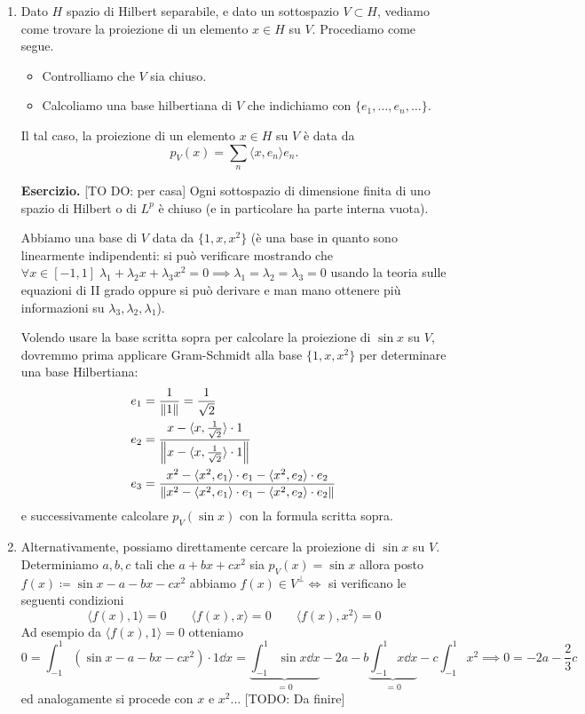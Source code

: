 \begin{enumerate}

\item Dato $H$ spazio di Hilbert separabile, e dato un sottospazio $V \subset H$, vediamo come trovare la proiezione di un elemento $x \in H$ su $V$. Procediamo come segue.
\begin{itemize}
	\item Controlliamo che $V$ sia chiuso.

	\item Calcoliamo una base hilbertiana di $V$ che indichiamo con $\{ e_1, \dots, e_n, \dots \}$. 
\end{itemize}
Il tal caso, la proiezione di un elemento $x \in H$  su $V$ è data da
$$
	p_V(x) = \sum_n \langle x, e_n \rangle e_n.
$$

\textbf{Esercizio.} [TO DO: per casa] Ogni sottospazio di dimensione finita  di uno spazio di Hilbert o di $L^p$ è chiuso (e in particolare ha parte interna vuota).

Abbiamo una base di $V$ data da $\{1, x, x^2\}$ (è una base in quanto sono linearmente indipendenti: si può verificare mostrando che $\forall x \in [-1, 1] \; \lambda_1 + \lambda_2 x + \lambda_3 x^2 = 0 \implies \lambda_1 = \lambda_2 = \lambda_3 = 0$ usando la teoria sulle equazioni di II grado oppure si può derivare e man mano ottenere più informazioni su $\lambda_3, \lambda_2, \lambda_1$).

Volendo usare la base scritta sopra per calcolare la proiezione di $\sin x$ su $V$, dovremmo prima applicare Gram-Schmidt alla base $\{1,x,x^2\}$ per determinare una base Hilbertiana:
$$
\begin{aligned}
	e_1 &= \frac{1}{\left\lVert 1 \right\rVert} = \frac{1}{\sqrt{2}} \\
	e_2 &= \frac{x - \langle x, \frac{1}{\sqrt 2} \rangle \cdot 1}{\left\lVert x - \langle x, \frac{1}{\sqrt 2} \rangle \cdot 1 \right\rVert} \\
	e_3 &= \frac{x^2 - \langle x^2, e_1 \rangle \cdot e_1 - \langle x^2, e_2 \rangle \cdot e_2}{\left\lVert x^2 - \langle x^2, e_1 \rangle \cdot e_1 - \langle x^2, e_2 \rangle \cdot e_2 \right\rVert} \\
\end{aligned}
$$
e successivamente calcolare $p_V(\sin x)$ con la formula scritta sopra.

\item Alternativamente, possiamo direttamente cercare la proiezione di $\sin x$ su $V$. Determiniamo $a, b, c$ tali che $a + b x + c x^2$ sia $p_V(x) = \sin x$ allora posto $f(x) \coloneqq \sin x - a - b x - c x^2$ abbiamo $f(x) \in V^\perp \iff $ si verificano le seguenti condizioni
$$
\langle f(x), 1 \rangle = 0
\qquad
\langle f(x), x \rangle = 0
\qquad
\langle f(x), x^2 \rangle = 0
$$
Ad esempio da $\langle f(x), 1 \rangle = 0$ otteniamo
$$
0 = \int_{-1}^1 (\sin x - a - b x - c x^2) \cdot 1 \dd x 
= \underbrace{\int_{-1}^1 \sin x \dd x}_{=0} - 2a - b \underbrace{\int_{-1}^1 x \dd x}_{=0} - c \int_{-1}^1 x^2
\implies 0 = -2a - \frac{2}{3}c
$$
ed analogamente si procede con $x$ e $x^2$... [TODO: Da finire]


\end{enumerate}
